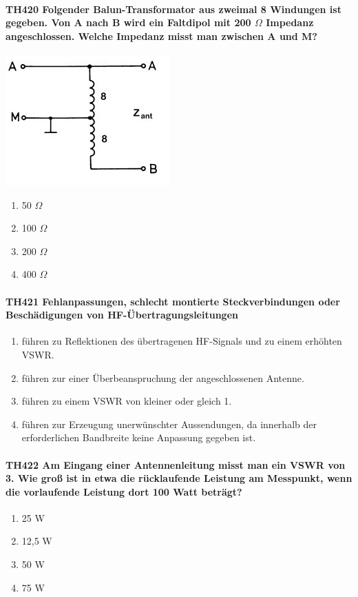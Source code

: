 \documentclass[8pt]{article}
\begin{document}
\paragraph*{TH420 Folgender Balun-Transformator aus zweimal 8 Windungen ist gegeben. Von A nach B wird ein Faltdipol mit 200 $\Omega$ Impedanz angeschlossen. Welche Impedanz misst man zwischen A und M?}
\begin{center}
	\begin{minipage}{\linewidth}
		\centering
		\includegraphics[scale=1.0]{pics/th420_a.jpg}
	\end{minipage}
\end{center}
\begin{enumerate}[nolistsep,label=\Alph*]
\item 50 $\Omega$
\item 100 $\Omega$
\item 200 $\Omega$
\item 400 $\Omega$
\end{enumerate}

\paragraph*{TH421 Fehlanpassungen, schlecht montierte Steckverbindungen oder Beschädigungen von HF-Übertragungsleitungen} 
\begin{enumerate}[nolistsep,label=\Alph*]
\item führen zu Reflektionen des übertragenen HF-Signals und zu einem erhöhten VSWR.
\item führen zur einer Überbeanspruchung der angeschlossenen Antenne.
\item führen zu einem VSWR von kleiner oder gleich 1.
\item führen zur Erzeugung unerwünschter Aussendungen, da innerhalb der erforderlichen Bandbreite keine Anpassung gegeben ist.
\end{enumerate}

\paragraph*{TH422 Am Eingang einer Antennenleitung misst man ein VSWR von 3. Wie groß ist in etwa die rücklaufende Leistung am Messpunkt, wenn die vorlaufende Leistung dort 100 Watt beträgt?}
\begin{enumerate}[nolistsep,label=\Alph*]
\item 25 W
\item 12,5 W
\item 50 W
\item 75 W
\end{enumerate}
\end{document}
